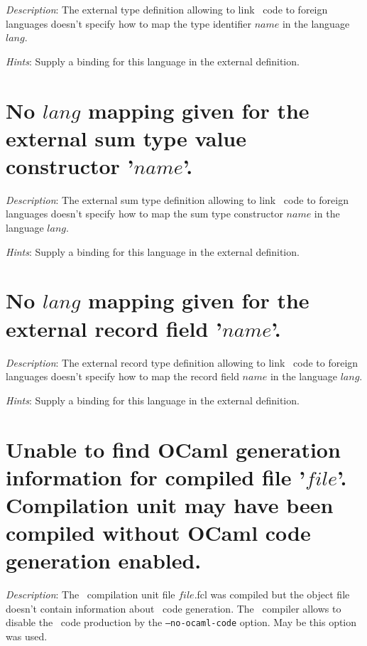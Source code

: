 {\em Description}: The external type definition allowing to link
\focal\ code to foreign languages doesn't specify how to map the type
identifier $name$ in the language $lang$.

{\em Hints}: Supply a binding for this language in the external
definition.



\section*{No $lang$ mapping given for the external sum type value
  constructor '$name$'.}

{\em Description}: The external sum type definition allowing to link
\focal\ code to foreign languages doesn't specify how to map the sum
type constructor $name$ in the language $lang$.

{\em Hints}: Supply a binding for this language in the external
definition.



\section*{No $lang$ mapping given for the external record field
  '$name$'.}

{\em Description}: The external record type definition allowing to
link \focal\ code to foreign languages doesn't specify how to map the
record field $name$ in the language $lang$.

{\em Hints}: Supply a binding for this language in the external
definition.



\section*{Unable to find OCaml generation information for compiled
  file '$file$'. Compilation unit may have been compiled without OCaml code
  generation enabled.}

{\em Description}: The \focal\ compilation unit file $file$.fcl was compiled but
the object file doesn't contain information about \ocaml\ code
generation. The \focal\ compiler allows to disable the \ocaml\ code
production by the {\tt --no-ocaml-code} option. May be this option was used.

